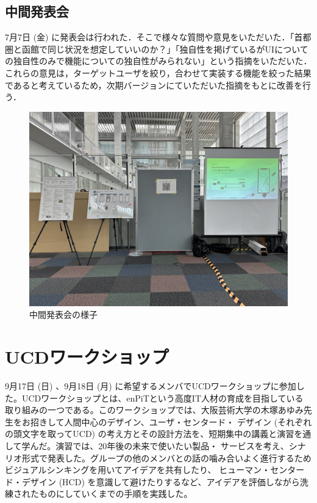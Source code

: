 \subsection{中間発表会}
7月7日 (金) に発表会は行われた．そこで様々な質問や意見をいただいた．「首都圏と函館で同じ状況を想定していいのか？」「独自性を掲げているがUIについての独自性のみで機能についての独自性がみられない」という指摘をいただいた．これらの意見は，ターゲットユーザを絞り，合わせて実装する機能を絞った結果であると考えているため，次期バージョンにていただいた指摘をもとに改善を行う．

\begin{figure}[htbp]
    \centering
    \includegraphics[width=12cm]{images/mid_presentation.png}
    \caption{中間発表会の様子}
    \label{fig:mid_presentation}
\end{figure}

\section{UCDワークショップ}
9月17日 (日) 、9月18日 (月) に希望するメンバでUCDワークショップに参加した。UCDワークショップとは、enPiTという高度IT人材の育成を目指している
取り組みの一つである。このワークショップでは、大阪芸術大学の木塚あゆみ先生をお招きして人間中心のデザイン、ユーザ・センタード・
デザイン (それぞれの頭文字を取ってUCD) の考え方とその設計方法を、短期集中の講義と演習を通して学んだ。演習では、20年後の未来で使いたい製品・
サービスを考え、シナリオ形式で発表した。グループの他のメンバとの話の噛み合いよく進行するためビジュアルシンキングを用いてアイデアを共有したり、
ヒューマン・センタード・デザイン (HCD) を意識して避けたりするなど、アイデアを評価しながら洗練されたものにしていくまでの手順を実践した。

